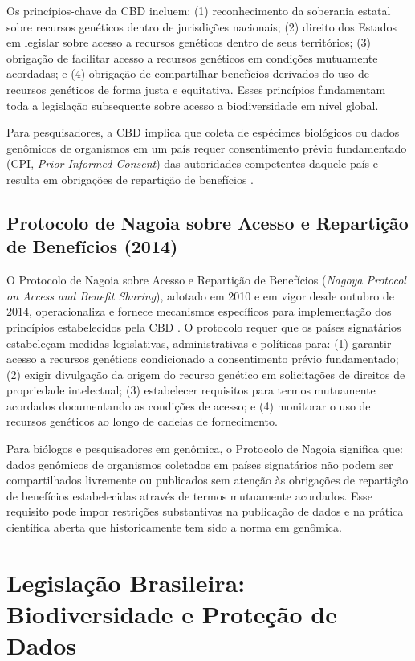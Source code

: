 Os princípios-chave da CBD incluem: (1) reconhecimento da soberania estatal sobre recursos genéticos dentro de jurisdições nacionais; (2) direito dos Estados em legislar sobre acesso a recursos genéticos dentro de seus territórios; (3) obrigação de facilitar acesso a recursos genéticos em condições mutuamente acordadas; e (4) obrigação de compartilhar benefícios derivados do uso de recursos genéticos de forma justa e equitativa. Esses princípios fundamentam toda a legislação subsequente sobre acesso a biodiversidade em nível global.

Para pesquisadores, a CBD implica que coleta de espécimes biológicos ou dados genômicos de organismos em um país requer consentimento prévio fundamentado (CPI, \textit{Prior Informed Consent}) das autoridades competentes daquele país e resulta em obrigações de repartição de benefícios \parencite{cbd1992}.

\subsection{Protocolo de Nagoia sobre Acesso e Repartição de Benefícios (2014)}

O Protocolo de Nagoia sobre Acesso e Repartição de Benefícios (\textit{Nagoya Protocol on Access and Benefit Sharing}), adotado em 2010 e em vigor desde outubro de 2014, operacionaliza e fornece mecanismos específicos para implementação dos princípios estabelecidos pela CBD \parencite{nagoyaprotocol2014}. O protocolo requer que os países signatários estabeleçam medidas legislativas, administrativas e políticas para: (1) garantir acesso a recursos genéticos condicionado a consentimento prévio fundamentado; (2) exigir divulgação da origem do recurso genético em solicitações de direitos de propriedade intelectual; (3) estabelecer requisitos para termos mutuamente acordados documentando as condições de acesso; e (4) monitorar o uso de recursos genéticos ao longo de cadeias de fornecimento.

Para biólogos e pesquisadores em genômica, o Protocolo de Nagoia significa que: dados genômicos de organismos coletados em países signatários não podem ser compartilhados livremente ou publicados sem atenção às obrigações de repartição de benefícios estabelecidas através de termos mutuamente acordados. Esse requisito pode impor restrições substantivas na publicação de dados e na prática científica aberta que historicamente tem sido a norma em genômica.

\section{Legislação Brasileira: Biodiversidade e Proteção de Dados}

